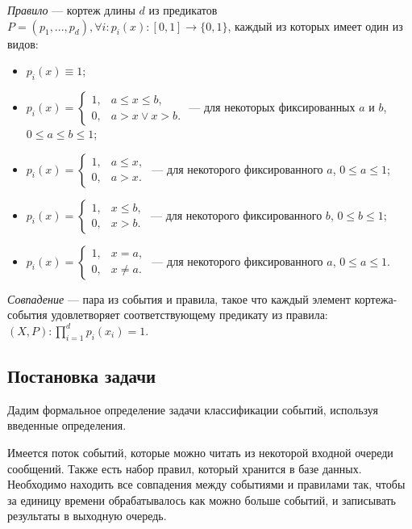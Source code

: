 \documentclass[14pt]{article}
\begin{document}
\emph{Правило} --- кортеж длины $d$ из предикатов $P = (p_1,...,p_d), \forall i: p_i(x): [0, 1] \rightarrow \{0, 1\}$, каждый из которых имеет один из видов:
\begin{itemize}
    \item $p_i(x) \equiv 1$;
    \item $ p_i(x) =
        \begin{cases}
        1, & a \leq x \leq b, \\
        0, & a > x \vee x > b.
        \end{cases}
    $ --- для некоторых фиксированных $a$ и $b$, $0 \leq a \leq b \leq 1$;
    \item $ p_i(x) =
        \begin{cases}
        1, & a \leq x, \\
        0, & a > x.
        \end{cases}
    $ --- для некоторого фиксированного $a$, $0 \leq a \leq 1$;
    \item $ p_i(x) =
        \begin{cases}
        1, & x \leq b, \\
        0, & x > b.
        \end{cases}
    $ --- для некоторого фиксированного $b$, $0 \leq b \leq 1$;
    \item $ p_i(x) =
        \begin{cases}
        1, & x = a, \\
        0, & x \neq a.
        \end{cases}
    $ --- для некоторого фиксированного $a$, $0 \leq a \leq 1$.
\end{itemize}

\emph{Совпадение} --- пара из события и правила, такое что каждый элемент кортежа-события удовлетворяет соответствующему предикату из правила: $(X, P): \prod_{i=1}^d p_i(x_i) = 1$.

\subsection{Постановка задачи}
Дадим формальное определение задачи классификации событий, используя введенные определения.

Имеется поток событий, которые можно читать из некоторой входной очереди сообщений. Также есть набор правил, который хранится в базе данных. Необходимо находить все совпадения между событиями и правилами так, чтобы за единицу времени обрабатывалось как можно больше событий, и записывать результаты в выходную очередь.
\end{document}

